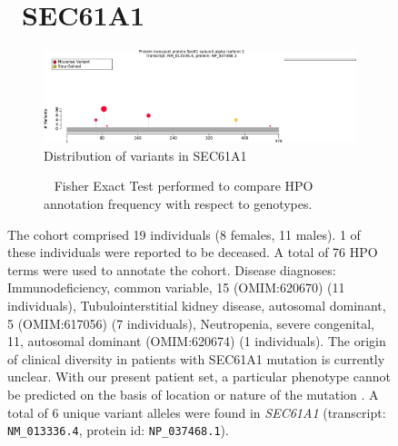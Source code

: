\begin{figure}[htbp]
\section*{ SEC61A1}
\centering
\begin{subfigure}[b]{0.95\textwidth}
\centering
\includegraphics[width=\textwidth]{ img/SEC61A1_protein_diagram.pdf} 
\captionsetup{justification=raggedright,singlelinecheck=false}
\caption{Distribution of variants in SEC61A1}
\end{subfigure}

\vspace{2em}

\begin{subfigure}[b]{0.95\textwidth}
\centering
{}
\captionsetup{justification=raggedright,singlelinecheck=false}
\caption{             Fisher Exact Test performed to compare HPO annotation frequency with respect to genotypes. }
\end{subfigure}

\vspace{2em}

\caption{ The cohort comprised 19 individuals (8 females, 11 males). 1 of these individuals were reported to be deceased. A total of 76 HPO terms were used to annotate the cohort. Disease diagnoses: Immunodeficiency, common variable, 15 (OMIM:620670) (11 individuals), Tubulointerstitial kidney disease, autosomal dominant, 5 (OMIM:617056) (7 individuals), Neutropenia, severe congenital, 11, autosomal dominant (OMIM:620674) (1 individuals). The origin of clinical diversity in patients with SEC61A1 mutation is currently unclear. 
With our present patient set, a particular phenotype cannot be predicted on the basis of location or nature of the mutation \cite{PMID_32325141}.
 A total of 6 unique variant alleles were found in \textit{SEC61A1} (transcript: \texttt{NM\_013336.4}, protein id: \texttt{NP\_037468.1}).}
\end{figure}

